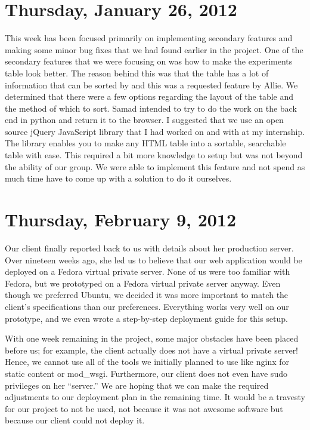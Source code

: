 \documentclass{article}
\begin{document}
\section{Thursday, January 26, 2012} %
This week has been focused primarily on implementing secondary features and making some minor bug fixes that
we had found earlier in the project. One of the secondary features that we were focusing on was how to make 
the experiments table look better. The reason behind this was that the table has a lot of information that 
can be sorted by and this was a requested feature by Allie. We determined that there were a few options 
regarding the layout of the table and the method of which to sort. Samad intended to try to do the work on the
back end in python and return it to the browser. I suggested that we use an open source jQuery JavaScript 
library that I had worked on and with at my internship. The library enables you to make any HTML table into a 
sortable, searchable table with ease. This required a bit more knowledge to setup but was not beyond the 
ability of our group. We were able to implement this feature and not spend as much time have to come up with
a solution to do it ourselves.

\section{Thursday, February 9, 2012} %
Our client finally reported back to us with details about her
production server. Over nineteen weeks ago, she led us to believe that
our web application would be deployed on a Fedora virtual private
server. None of us were too familiar with Fedora, but we prototyped on
a Fedora virtual private server anyway. Even though we preferred
Ubuntu, we decided it was more important to match the client's
specifications than our preferences. Everything works very well on our
prototype, and we even wrote a step-by-step deployment guide for this
setup.

With one week remaining in the project, some major obstacles have been
placed before us; for example, the client actually does not have a
virtual private server! Hence, we cannot use all of the tools we
initially planned to use like nginx for static content or mod\_wsgi.
Furthermore, our client does not even have sudo privileges on her
``server.'' We are hoping that we can make the required adjustments to
our deployment plan in the remaining time. It would be a travesty for
our project to not be used, not because it was not awesome software
but because our client could not deploy it.
\end{document}
